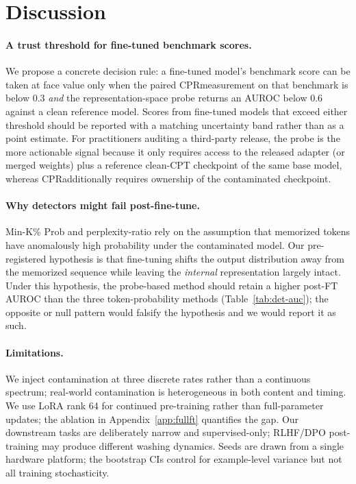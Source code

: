\documentclass{article}
\newcommand{\cpr}{\ensuremath{\mathrm{CPR}}}
\begin{document}
\section{Discussion}
\label{sec:discussion}

\paragraph{A trust threshold for fine-tuned benchmark scores.}
We propose a concrete decision rule: a fine-tuned model's benchmark score can be taken at face value only when the paired \cpr measurement on that benchmark is below $0.3$ \emph{and} the representation-space probe returns an AUROC below $0.6$ against a clean reference model. Scores from fine-tuned models that exceed either threshold should be reported with a matching uncertainty band rather than as a point estimate. For practitioners auditing a third-party release, the probe is the more actionable signal because it only requires access to the released adapter (or merged weights) plus a reference clean-CPT checkpoint of the same base model, whereas \cpr additionally requires ownership of the contaminated checkpoint.

\paragraph{Why detectors might fail post-fine-tune.}
Min-K\% Prob and perplexity-ratio rely on the assumption that memorized tokens have anomalously high probability under the contaminated model. Our pre-registered hypothesis is that fine-tuning shifts the output distribution away from the memorized sequence while leaving the \emph{internal} representation largely intact. Under this hypothesis, the probe-based method should retain a higher post-FT AUROC than the three token-probability methods (Table~\ref{tab:det-auc}); the opposite or null pattern would falsify the hypothesis and we would report it as such.

\paragraph{Limitations.}
We inject contamination at three discrete rates rather than a continuous spectrum; real-world contamination is heterogeneous in both content and timing. We use LoRA rank 64 for continued pre-training rather than full-parameter updates; the ablation in Appendix~\ref{app:fullft} quantifies the gap. Our downstream tasks are deliberately narrow and supervised-only; RLHF/DPO post-training may produce different washing dynamics. Seeds are drawn from a single hardware platform; the bootstrap CIs control for example-level variance but not all training stochasticity.
\end{document}
